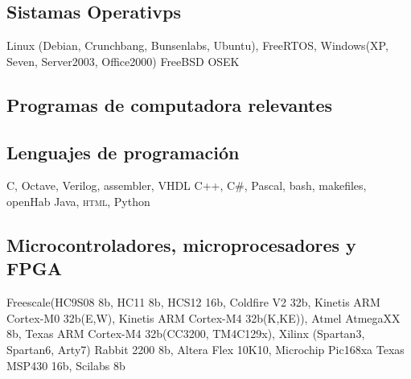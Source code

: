 \documentclass[11pt,a4paper,sans]{moderncv}  %
\begin{document}
   \subsection{Sistamas Operativps}
      { Linux (Debian, Crunchbang, Bunsenlabs, Ubuntu), FreeRTOS, Windows(XP, Seven, Server2003, Office2000) }
    { FreeBSD                                                                                              }
        { OSEK                                                                                                 }

   \subsection{Programas de computadora relevantes}

   \subsection{Lenguajes de programación}
      { C, Octave, Verilog, assembler, VHDL}
    { C++, C\#,  Pascal, bash, makefiles, openHab}
        { Java, \textsc { html}, Python}

   \subsection{Microcontroladores, microprocesadores y FPGA}
      { Freescale(HC9S08 8b, HC11 8b, HCS12 16b, Coldfire V2 32b, Kinetis ARM Cortex-M0 32b(E,W), Kinetis ARM Cortex-M4 32b(K,KE)), Atmel AtmegaXX 8b, Texas ARM Cortex-M4 32b(CC3200, TM4C129x), Xilinx (Spartan3, Spartan6, Arty7)}
    { Rabbit 2200 8b, Altera Flex 10K10, Microchip Pic168xa}
        { Texas MSP430 16b, Scilabs 8b}
   
\end{document}
